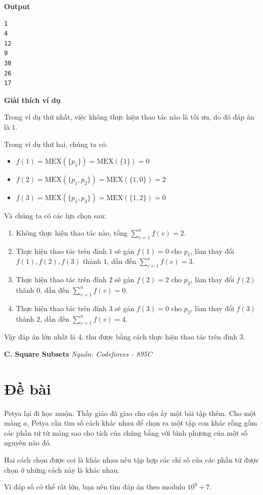 \documentclass[12pt,a4paper]{article}
\newcommand{\problem}[2]{%
  \addcontentsline{toc}{section}{#1}%
  \begin{mdframed}[
    linecolor=framecolor,
    linewidth=1.5pt,
    backgroundcolor=white,
    topline=true, bottomline=true,
    leftline=true, rightline=true,
    innerleftmargin=10pt, innerrightmargin=10pt,
    innertopmargin=6pt, innerbottommargin=6pt,
  ]
  \textbf{\large #1} \hfill \textit{Nguồn: #2}
  \end{mdframed}
  \vspace{4pt}%
}
\newcommand{\explanation}{%
  \vspace{6pt}\textbf{\textcolor{sectioncolor}{Giải thích ví dụ}}\par\vspace{2pt}%
}
\begin{document}
\textbf{Output}

\begin{lstlisting}
1
4
12
9
30
26
17
\end{lstlisting}


\explanation
Trong ví dụ thứ nhất, việc không thực hiện thao tác nào là tối ưu, do đó đáp án là $1$.

Trong ví dụ thứ hai, chúng ta có:
\begin{itemize}
    \item $f(1) = \text{MEX}(\{p_1\}) = \text{MEX}(\{1\}) = 0$
    \item $f(2) = \text{MEX}(\{p_1, p_2\}) = \text{MEX}(\{1, 0\}) = 2$
    \item $f(3) = \text{MEX}(\{p_1, p_3\}) = \text{MEX}(\{1, 2\}) = 0$
\end{itemize}

Và chúng ta có các lựa chọn sau:
\begin{enumerate}
    \item Không thực hiện thao tác nào, tổng $\sum_{v = 1}^n f(v) = 2$.
    \item Thực hiện thao tác trên đỉnh $1$ sẽ gán $f(1) = 0$ cho $p_1$, làm thay đổi $f(1), f(2), f(3)$ thành $1$, dẫn đến $\sum_{v = 1}^n f(v) = 3$.
    \item Thực hiện thao tác trên đỉnh $2$ sẽ gán $f(2) = 2$ cho $p_2$, làm thay đổi $f(2)$ thành $0$, dẫn đến $\sum_{v = 1}^n f(v) = 0$.
    \item Thực hiện thao tác trên đỉnh $3$ sẽ gán $f(3) = 0$ cho $p_3$, làm thay đổi $f(3)$ thành $2$, dẫn đến $\sum_{v = 1}^n f(v) = 4$.
\end{enumerate}

Vậy đáp án lớn nhất là $4$, thu được bằng cách thực hiện thao tác trên đỉnh $3$.

\newpage
\problem{C. Square Subsets}{Codeforces - 895C}

\section*{Đề bài}
Petya lại đi học muộn. Thầy giáo đã giao cho cậu ấy một bài tập thêm. Cho một mảng $a$, Petya cần tìm số cách khác nhau để chọn ra một tập con khác rỗng gồm các phần tử từ mảng sao cho tích của chúng bằng với bình phương của một số nguyên nào đó.

Hai cách chọn được coi là khác nhau nếu tập hợp các chỉ số của các phần tử được chọn ở những cách này là khác nhau.

Vì đáp số có thể rất lớn, bạn nên tìm đáp án theo modulo $10^9+7$.
\end{document}
